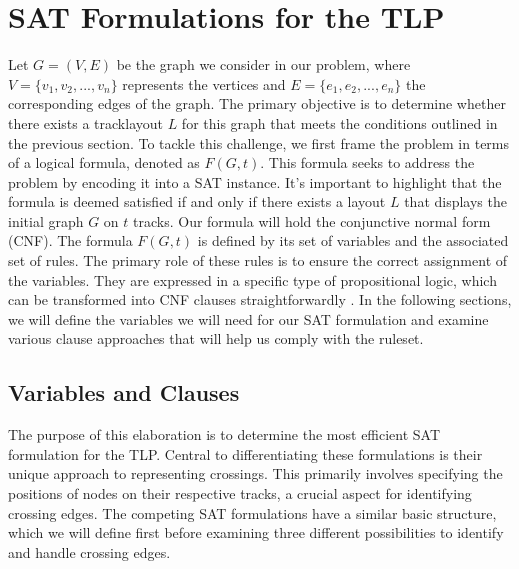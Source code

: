 \documentclass[bachelor, english]{algothesis}
\begin{document}
\chapter{SAT Formulations for the TLP} 
\label{chap:Formulation_of_tlp}
Let $G = (V,E)$ be the graph we consider in our problem, where $V =\{v_1,v_2,...,v_n\}$ represents the vertices and $E = \{e_1,e_2,...,e_n\}$ the corresponding edges of the graph. The primary objective is to determine whether there exists a tracklayout $L$ for this graph that meets the conditions outlined in the previous section. To tackle this challenge, we first frame the problem in terms of a logical formula, denoted as $F(G, t)$. This formula seeks to address the problem by encoding it into a SAT instance. It's important to highlight that the formula is deemed satisfied if and only if there exists a layout $L$ that displays the initial graph $G$ on $t$ tracks. Our formula will hold the conjunctive normal form (CNF). The formula $F(G, t)$ is defined by its set of variables and the associated set of rules. The primary role of these rules is to ensure the correct assignment of the variables. They are expressed in a specific type of propositional logic, which can be transformed into CNF clauses straightforwardly \cite{conjunction}. In the following sections, we will define the variables we will need for our SAT formulation and examine various clause approaches that will help us comply with the ruleset.

\section{Variables and Clauses}
\label{sec:vars_clauses}
The purpose of this elaboration is to determine the most efficient SAT formulation for the TLP. Central to differentiating these formulations is their unique approach to representing crossings. This primarily involves specifying the positions of nodes on their respective tracks, a crucial aspect for identifying crossing edges. The competing SAT formulations have a similar basic structure, which we will define first before examining three different possibilities to identify and handle crossing edges.
\newline

\label{sec:basic_clauses}
\end{document}
